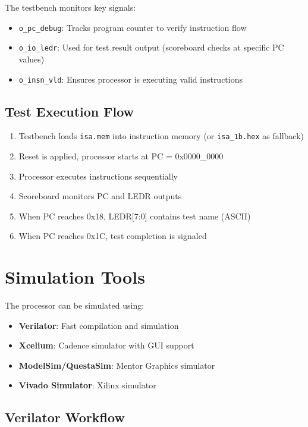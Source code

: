 The testbench monitors key signals:

\begin{itemize}
    \item \texttt{o\_pc\_debug}: Tracks program counter to verify instruction flow
    \item \texttt{o\_io\_ledr}: Used for test result output (scoreboard checks at specific PC values)
    \item \texttt{o\_insn\_vld}: Ensures processor is executing valid instructions
\end{itemize}

\subsection{Test Execution Flow}

\begin{enumerate}
    \item Testbench loads \texttt{isa.mem} into instruction memory (or \texttt{isa\_1b.hex} as fallback)
    \item Reset is applied, processor starts at PC = 0x0000\_0000
    \item Processor executes instructions sequentially
    \item Scoreboard monitors PC and LEDR outputs
    \item When PC reaches 0x18, LEDR[7:0] contains test name (ASCII)
    \item When PC reaches 0x1C, test completion is signaled
\end{enumerate}

\section{Simulation Tools}

The processor can be simulated using:

\begin{itemize}
    \item \textbf{Verilator}: Fast compilation and simulation
    \item \textbf{Xcelium}: Cadence simulator with GUI support
    \item \textbf{ModelSim/QuestaSim}: Mentor Graphics simulator
    \item \textbf{Vivado Simulator}: Xilinx simulator
\end{itemize}

\subsection{Verilator Workflow}

